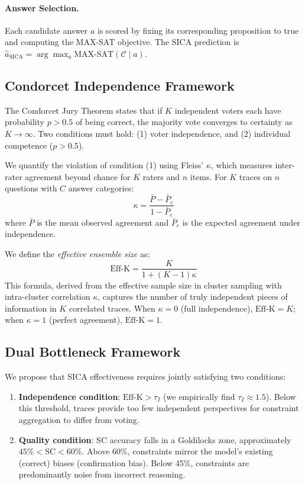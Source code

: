 \documentclass[11pt,a4paper]{article}
\newcommand{\effk}{\text{Eff-K}}
\begin{document}
\paragraph{Answer Selection.} Each candidate answer $a$ is scored by fixing its corresponding proposition to true and computing the MAX-SAT objective. The SICA prediction is $\hat{a}_{\text{SICA}} = \arg\max_a \text{MAX-SAT}(\mathcal{C} \mid a)$.

\subsection{Condorcet Independence Framework}
\label{sec:condorcet}

The Condorcet Jury Theorem states that if $K$ independent voters each have probability $p > 0.5$ of being correct, the majority vote converges to certainty as $K \to \infty$. Two conditions must hold: (1) voter independence, and (2) individual competence ($p > 0.5$).

We quantify the violation of condition (1) using Fleiss' $\kappa$, which measures inter-rater agreement beyond chance for $K$ raters and $n$ items. For $K$ traces on $n$ questions with $C$ answer categories:
\begin{equation}
\kappa = \frac{\bar{P} - \bar{P}_e}{1 - \bar{P}_e}
\end{equation}
where $\bar{P}$ is the mean observed agreement and $\bar{P}_e$ is the expected agreement under independence.

We define the \emph{effective ensemble size} as:
\begin{equation}
\effk = \frac{K}{1 + (K-1)\kappa}
\end{equation}
This formula, derived from the effective sample size in cluster sampling with intra-cluster correlation $\kappa$, captures the number of truly independent pieces of information in $K$ correlated traces. When $\kappa = 0$ (full independence), $\effk = K$; when $\kappa = 1$ (perfect agreement), $\effk = 1$.

\subsection{Dual Bottleneck Framework}

We propose that SICA effectiveness requires jointly satisfying two conditions:

\begin{enumerate}
\item \textbf{Independence condition}: $\effk > \tau_I$ (we empirically find $\tau_I \approx 1.5$). Below this threshold, traces provide too few independent perspectives for constraint aggregation to differ from voting.
\item \textbf{Quality condition}: SC accuracy falls in a Goldilocks zone, approximately $45\% < \text{SC} < 60\%$. Above 60\%, constraints mirror the model's existing (correct) biases (confirmation bias). Below 45\%, constraints are predominantly noise from incorrect reasoning.
\end{enumerate}
\end{document}
